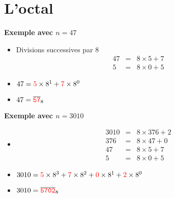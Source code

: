 \section{L'octal}

\begin{frame}

  
\medskip

\pause

\textbf{Exemple avec $n=47$}

  \begin{itemize}
    \pause
  \item Divisions successives par 8
    $$\begin{array}{rcl}
  47 &=& 8\times 5 + 7\\
  5  &=& 8\times 0 + 5
  \end{array}$$

\pause
  \item $47 = \textcolor{red}{5}\times 8^1 + \textcolor{red}{7}\times 8^0$
  
    \pause
  \item $47 = \overline{\textcolor{red}{\mathtt{57}}}_8$
  \end{itemize}
  
\medskip

\pause
\textbf{Exemple avec $n=3010$}
  \begin{itemize}
\pause
  \item
  $$\begin{array}{rcl}
  3010 &=& 8\times 376 + 2\\
  376  &=& 8\times 47 + 0\\
  47   &=& 8\times 5 + 7\\
  5    &=& 8\times 0 + 5
  \end{array}$$
\pause
  
  \item $3010 = \textcolor{red}{5}\times 8^3 + \textcolor{red}{7}\times 8^2 + \textcolor{red}{0}\times 8^1 + \textcolor{red}{2}\times 8^0$
  
\pause
  \item $3010 = \overline{\textcolor{red}{\mathtt{5702}}}_8$
  \end{itemize}

\end{frame}

